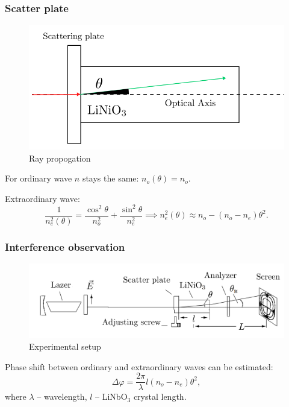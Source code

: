 \documentclass{beamer}
\begin{document}
		
	\begin{frame}
		\frametitle{Scatter plate}		
		\begin{figure}
			\footnotesize
			\centering
			\includegraphics[width=0.9\linewidth]{res/theta_propagation}
			\vspace{-5pt}
			\footnotesize
			\caption{\footnotesize Ray propogation}
		\end{figure}
		
		For ordinary wave $n$ stays the same: $n_o(\theta) = n_o$.
		
		Extraordinary wave:
		\footnotesize
		$$\frac{1}{n_e^2(\theta)} = \frac{\cos^2{\theta}}{n_o^2} + \frac{\sin^2{\theta}}{n_e^2} \implies n_e^2(\theta) \approx n_o - (n_o - n_e) \theta^2.$$

	\end{frame}
	
	\begin{frame}
		\frametitle{Interference observation}
		
		\begin{figure}
			\centering
			\includegraphics[width=1\linewidth]{res/scheme}
			\caption{Experimental setup}
		\end{figure}
		
		Phase shift between ordinary and extraordinary waves can be estimated:
		$$
		\Delta \varphi = \frac{2\pi}{\lambda}l(n_o - n_e)\theta^2,
		$$
		where $\lambda$ -- wavelength, $l$ -- LiNbO$_3$ crystal length.
	\end{frame}
\end{document}
